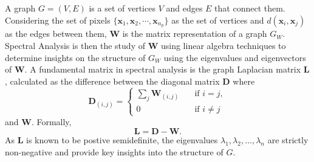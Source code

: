A graph $G = (V,E)$ is a set of vertices $V$ and edges $E$ that connect them. Considering the set of pixels $\{\mathbf{x}_1, \mathbf{x}_2 , \cdots , \mathbf{x}_{n_p} \}$ as the set of vertices and $d(\mathbf{x}_i, \mathbf{x}_j)$ as the edges between them, $\mathbf{W}$ is the matrix representation of a graph $G_W$. Spectral Analysis is then the study of $\mathbf{W}$ using linear algebra techniques to determine insights on the structure of $G_W$ using the eigenvalues and eigenvectors of $\mathbf{W}$. A fundamental matrix in spectral analysis is the graph Laplacian matrix $\mathbf{L}$, calculated as the difference between the diagonal matrix $\mathbf{D}$ where
\begin{equation}
    \label{sc:d-mtx}
    \mathbf{D}_{(i,j)} = \begin{cases}
        \sum _{j}\mathbf{W}_{(i,j)} &\quad \text{if } i = j,\\
        0 & \quad \text{if } i \neq j
    \end{cases}
\end{equation}
and $\mathbf{W}$. Formally,
\begin{equation}
    \label{sc:laplacian-mtx}
    \mathbf{L} = \mathbf{D} - \mathbf{W}.
\end{equation}
As $\mathbf{L}$ is known to be postive semidefinite, the eigenvalues $\lambda_1, \lambda_2, \dots, \lambda_{n}$ are strictly non-negative and provide key insights into the structure of $G$.